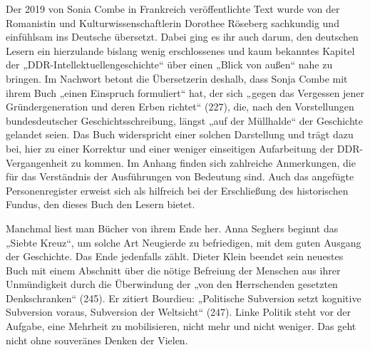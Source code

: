 \begin{multicols*}{2}
    Der 2019 von Sonia Combe in Frankreich veröffentlichte Text wurde von der Romanistin und Kulturwissenschaftlerin Dorothee Röseberg sachkundig und einfühlsam ins Deutsche übersetzt. Dabei ging es ihr auch darum, den deutschen Lesern ein hierzulande bislang wenig erschlossenes und kaum bekanntes Kapitel der „DDR-Intellektuellengeschichte“ über einen „Blick von außen“ nahe zu bringen. Im Nachwort betont die Übersetzerin deshalb, dass Sonja Combe mit ihrem Buch „einen Einspruch formuliert“ hat, der sich „gegen das Vergessen jener Gründergeneration und deren Erben richtet“ (227), die, nach den Vorstellungen bundesdeutscher Geschichtsschreibung, längst „auf der Müllhalde“ der Geschichte gelandet seien. Das Buch widerspricht einer solchen Darstellung und trägt dazu bei, hier zu einer Korrektur und einer weniger einseitigen Aufarbeitung der DDR-Vergangenheit zu kommen. Im Anhang finden sich zahlreiche Anmerkungen, die für das Verständnis der Ausführungen von Bedeutung sind. Auch das angefügte Personenregister erweist sich als hilfreich bei der Erschließung des historischen Fundus, den dieses Buch den Lesern bietet. \\\bigskip
    
    

    \noindent Manchmal liest man Bücher von ihrem Ende her. Anna Seghers beginnt das „Siebte Kreuz“, um solche Art Neugierde zu befriedigen, mit dem guten Ausgang der Geschichte. Das Ende jedenfalls zählt. Dieter Klein beendet sein neuestes Buch mit einem Abschnitt über die nötige Befreiung der Menschen aus ihrer Unmündigkeit durch die Überwindung der „von den Herrschenden gesetzten Denkschranken“ (245). Er zitiert Bourdieu: „Politische Subversion setzt kognitive Subversion voraus, Subversion der Weltsicht“ (247). Linke Politik steht vor der Aufgabe, eine Mehrheit zu mobilisieren, nicht mehr und nicht weniger. Das geht nicht ohne souveränes Denken der Vielen. 


\end{multicols*}
